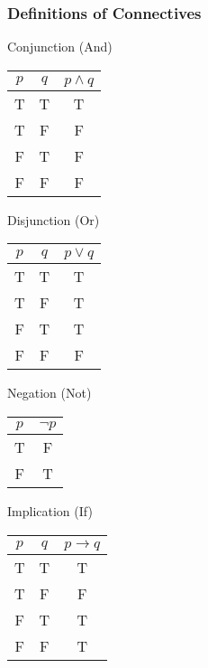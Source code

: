 \documentclass{beamer}
\begin{document}
\begin{frame}[fragile]
  \frametitle{Definitions of Connectives}
  \begin{minipage}{0.32\textwidth}
    Conjunction (And) \\
    \begin{tabular}{| c | c | c |}
    \hline
    $p$ & $q$ & $p \land q$ \\
    \hline
    T & T & T \\
    T & F & F \\
    F & T & F \\
    F & F & F \\
    \hline
    \end{tabular}
  \end{minipage}
  \begin{minipage}{0.32\textwidth}
    Disjunction (Or) \\
    \begin{tabular}{| c | c | c |}
    \hline
    $p$ & $q$ & $p \lor q$ \\
    \hline
    T & T & T \\
    T & F & T \\
    F & T & T \\
    F & F & F \\
    \hline
    \end{tabular}
  \end{minipage}
  \begin{minipage}{0.32\textwidth}
    Negation (Not) \\
    \begin{tabular}{| c | c |}
    \hline
    $p$ & $\lnot p$ \\
    \hline
    T & F \\
    F & T \\
    \hline
    \end{tabular}
  \end{minipage}
  \begin{minipage}{0.32\textwidth}
    $\;$ \\
    Implication (If) \\
    \begin{tabular}{| c | c | c |}
    \hline
    $p$ & $q$ & $p \rightarrow q$ \\
    \hline
    T & T & T \\
    T & F & F \\
    F & T & T \\
    F & F & T \\
    \hline
    \end{tabular}

\end{minipage}
\end{frame}
\end{document}
